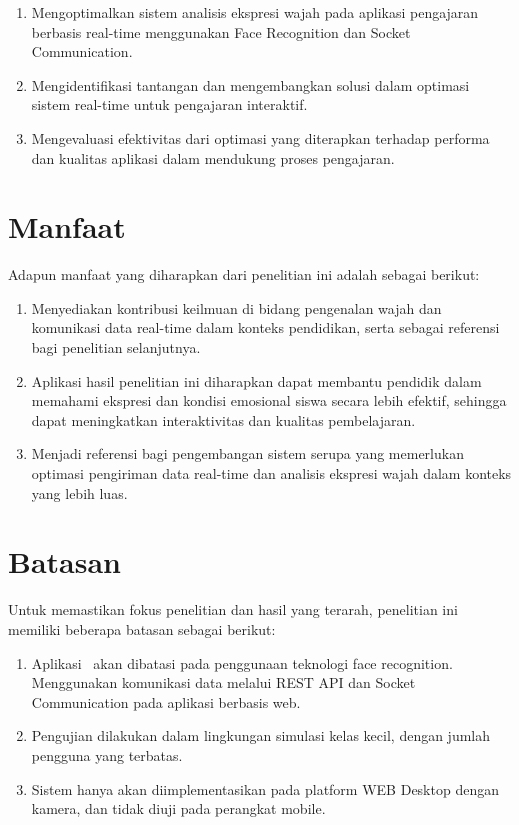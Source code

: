 \begin{enumerate}
  \item
    {Mengoptimalkan sistem analisis ekspresi wajah pada aplikasi pengajaran berbasis real-time menggunakan Face Recognition dan Socket Communication.}
  \item
    {Mengidentifikasi tantangan dan mengembangkan solusi dalam optimasi sistem real-time untuk pengajaran interaktif.}
  \item
    {Mengevaluasi efektivitas dari optimasi yang diterapkan terhadap performa dan kualitas aplikasi dalam mendukung proses pengajaran.}
\end{enumerate}

\section{Manfaat}

{Adapun manfaat yang diharapkan dari penelitian ini adalah sebagai
berikut:}

\begin{enumerate}
  \item
    {Menyediakan kontribusi keilmuan di bidang pengenalan wajah dan komunikasi data real-time dalam konteks pendidikan, serta sebagai referensi bagi penelitian selanjutnya.}
  \item
    {Aplikasi hasil penelitian ini diharapkan dapat membantu pendidik
      dalam memahami ekspresi dan kondisi emosional siswa secara lebih
      efektif, sehingga dapat meningkatkan interaktivitas dan kualitas
    pembelajaran.}
  \item
    {Menjadi referensi bagi pengembangan sistem serupa yang memerlukan optimasi pengiriman data real-time dan analisis ekspresi wajah dalam konteks yang lebih luas.}
\end{enumerate}

\section{Batasan}

{Untuk memastikan fokus penelitian dan hasil yang terarah, penelitian
ini memiliki beberapa batasan sebagai berikut:}

\begin{enumerate}
  \item
    {Aplikasi ~akan dibatasi pada penggunaan teknologi face recognition. Menggunakan komunikasi data melalui REST API dan Socket Communication pada aplikasi berbasis web.}
  \item
    {Pengujian dilakukan dalam lingkungan simulasi kelas kecil, dengan jumlah pengguna yang terbatas.}
  \item
    {Sistem hanya akan diimplementasikan pada platform WEB Desktop dengan kamera, dan tidak diuji pada perangkat mobile.}
\end{enumerate}
